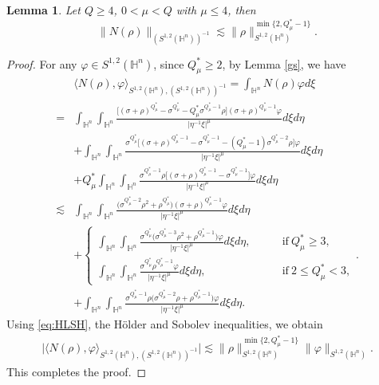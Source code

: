 \documentclass[11pt]{article}
\newtheorem{lemma}{Lemma}[section]
\begin{document}
  \begin{lemma}\label{main1}
 Let $Q\geq 4$, $0<\mu< Q$ with $\mu\leq 4$, then
 \begin{equation*}
 \|N(\rho)\|_{(S^{1,2}(\mathbb{H}^{n}))^{-1}} \lesssim \|\rho\|_{S^{1,2}(\mathbb{H}^{n})}^{\min\{2,Q_\mu^*-1\}}.
 \end{equation*}
\end{lemma}
\begin{proof}
For any $\varphi\in S^{1,2}(\mathbb{H}^{n})$, since $Q_\mu^*\geq2$, by Lemma \ref{gs},  we have
\begin{align*}
 &\langle N(\rho),\varphi\rangle_{S^{1,2}(\mathbb{H}^{n}),(S^{1,2}(\mathbb{H}^{n}))^{-1}} =\int_{\mathbb{H}^{n}}N(\rho)\varphi d\xi \\ =&\int_{\mathbb{H}^{n}}\int_{\mathbb{H}^{n}}\frac{\big[(\sigma+\rho)^{Q_\mu^*}-\sigma^{Q_\mu^*}-Q^*_\mu \sigma^{Q^*_\mu-1}\rho\big](\sigma+\rho)^{Q^*_\mu-1}\varphi}{|\eta^{-1}\xi|^\mu}d\xi d\eta
  \\&+\displaystyle \int_{\mathbb{H}^{n}}\int_{\mathbb{H}^{n}}\frac{\sigma^{Q^*_\mu}\big[(\sigma+\rho)^{Q^*_\mu-1}-\sigma^{Q^*_\mu-1}-(Q^*_\mu-1)\sigma^{Q^*_\mu-2}\rho\big]\varphi}{|\eta^{-1}\xi|^\mu}
  d\xi d\eta\\
  &+Q^*_\mu\displaystyle\int_{\mathbb{H}^{n}}\int_{\mathbb{H}^{n}}\frac{\sigma^{Q^*_\mu-1}\rho
  \big[(\sigma+\rho)^{Q^*_\mu-1}-\sigma^{Q^*_\mu-1}\big]
  \varphi}{|\eta^{-1}\xi|^\mu}d\xi d\eta\\
  \lesssim& \int_{\mathbb{H}^{n}}\int_{\mathbb{H}^{n}}
  \frac{\big( \sigma^{Q^*_\mu-2}\rho^2+\rho^{Q_\mu^*}\big)(\sigma+\rho)^{Q^*_\mu-1}\varphi}{|\eta^{-1}\xi|^\mu}d\xi d\eta
 \\&+ \begin{cases}
             \displaystyle \int_{\mathbb{H}^{n}}\int_{\mathbb{H}^{n}}
             \frac{\sigma^{Q^*_\mu}\big(\sigma^{Q^*_\mu-3}\rho^2+\rho^{Q^*_\mu-1}\big)\varphi}{|\eta^{-1}\xi|^\mu}
  d\xi d\eta, \qquad & \mathrm{if} ~ Q_\mu^*\geq3, \\
              \displaystyle \int_{\mathbb{H}^{n}}\int_{\mathbb{H}^{n}}
             \frac{\sigma^{Q^*_\mu}\rho^{Q^*_\mu-1}\varphi}{|\eta^{-1}\xi|^\mu}
  d\xi d\eta, \qquad& \mathrm{if} ~ 2\leq Q_\mu^*<3,
           \end{cases}.\\
           &+\displaystyle\int_{\mathbb{H}^{n}}\int_{\mathbb{H}^{n}}\frac{\sigma^{Q^*_\mu-1}\rho
  \big(\sigma^{Q^*_\mu-2}\rho+\rho^{Q^*_\mu-1}\big)
  \varphi}{|\eta^{-1}\xi|^\mu}d\xi d\eta.
\end{align*}
Using \eqref{eq:HLSH}, the H\"{o}lder and Sobolev inequalities, we obtain
\begin{align*}
 \big|\langle N(\rho),\varphi\rangle_{S^{1,2}(\mathbb{H}^{n}),(S^{1,2}(\mathbb{H}^{n}))^{-1}} \big|\lesssim \|\rho\|_{S^{1,2}(\mathbb{H}^{n})}^{\min\{2,Q_\mu^*-1\}}\|\varphi\|_{S^{1,2}(\mathbb{H}^{n})}.
\end{align*}
This completes the proof.
\end{proof}
\end{document}
